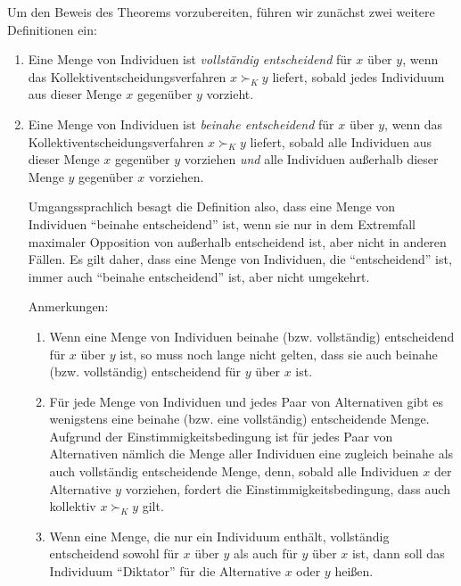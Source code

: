 Um den Beweis des Theorems vorzubereiten, führen wir zunächst zwei weitere
Definitionen ein:
\begin{enumerate}
  \item Eine Menge von Individuen ist {\em vollständig entscheidend} für $x$
  über $y$, wenn das Kollektiventscheidungsverfahren $x \succ_K y$ liefert,
  sobald jedes Individuum aus dieser Menge $x$ gegenüber $y$ vorzieht.

  \item Eine Menge von Individuen ist {\em beinahe entscheidend} für $x$ über
  $y$, wenn das Kollektiventscheidungsverfahren $x \succ_K y$ liefert, sobald
  alle Individuen aus dieser Menge $x$ gegenüber $y$ vorziehen {\em und} alle
  Individuen außerhalb dieser Menge $y$ gegenüber $x$ vorziehen.
  
  {\footnotesize Umgangssprachlich besagt die Definition also, dass eine Menge
  von Individuen "`beinahe entscheidend"' ist, wenn sie nur in dem Extremfall
  maximaler Opposition von außerhalb entscheidend ist, aber nicht in anderen
  Fällen. Es gilt daher, dass eine Menge von Individuen, die "`entscheidend"'
  ist, immer auch "`beinahe entscheidend"' ist, aber nicht umgekehrt.}
  
  Anmerkungen:
  \begin{enumerate}
    \item Wenn eine Menge von Individuen beinahe (bzw. vollständig) entscheidend
    für $x$ über $y$ ist, so muss noch lange nicht gelten, dass sie auch
    beinahe (bzw. vollständig) entscheidend für $y$ über $x$ ist.
    \item \label{Anmerkung2}  Für jede Menge von Individuen und jedes Paar von
    Alternativen gibt es wenigstens eine beinahe (bzw. eine vollständig) 
    entscheidende Menge. Aufgrund der Einstimmigkeitsbedingung ist für jedes
    Paar von Alternativen nämlich die
    Menge aller Individuen eine zugleich beinahe als auch
    vollständig entscheidende Menge, denn, sobald alle Individuen $x$ der
    Alternative $y$ vorziehen, fordert die Einstimmigkeitsbedingung, 
    dass auch kollektiv $x \succ_K y$ gilt.
    \item Wenn eine Menge, die nur ein Individuum enthält, vollständig
    entscheidend sowohl für $x$ über $y$ als auch für $y$ über $x$ ist, dann
    soll das Individuum "`Diktator"' für die Alternative $x$ oder $y$ heißen.
  \end{enumerate} 


\end{enumerate}
